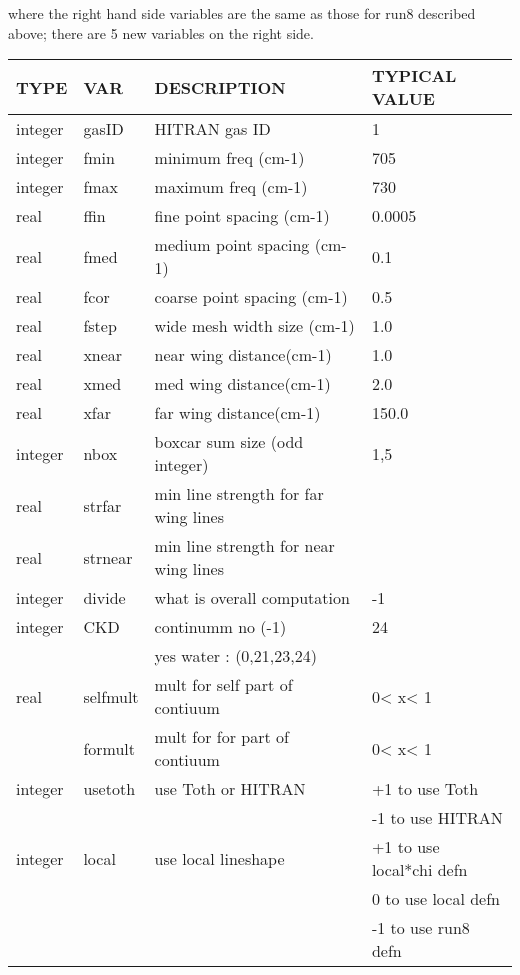 \documentclass[11pt]{article}
\begin{document}
where the right hand side variables are the same as those for run8 
described above; there are 5 new variables on the right side.

\begin{longtable}{llll}
\hline
\hline
  TYPE  &   VAR  &         DESCRIPTION  &            TYPICAL VALUE\\
\hline
\hline
integer & gasID  &       HITRAN gas ID      &            1\\
\hline

integer & fmin    &      minimum freq (cm-1) &          705\\
integer & fmax    &      maximum freq (cm-1) &          730\\
\hline

real   &  ffin    &      fine point spacing (cm-1) &    0.0005\\
real   &  fmed    &      medium point spacing (cm-1)&   0.1\\
real   &  fcor    &      coarse point spacing (cm-1)  & 0.5\\
\hline

real   &  fstep   &      wide mesh width size (cm-1) &    1.0\\
real   &  xnear   &      near wing distance(cm-1)    &    1.0\\
real   &  xmed    &      med wing distance(cm-1)     &    2.0\\
real   &  xfar    &      far wing distance(cm-1)     &    150.0\\
\hline

integer & nbox     &     boxcar sum size (odd integer) &  1,5\\
\hline

real   &  strfar   &    min line strength for far wing lines & \\
real   &  strnear  &    min line strength for near wing lines& \\
\hline
integer &  divide  &      what is overall computation    &   -1 \\
integer &  CKD     &       continumm no (-1)            &   24 \\
        &          &       yes water : (0,21,23,24)     &      \\
\hline

real    &  selfmult &       mult for self part of contiuum & 0< x< 1 \\
        &  formult  &       mult for for  part of contiuum & 0< x< 1 \\
\hline

integer & usetoth &        use Toth or HITRAN &           +1 to use Toth \\
        &         &                           &          -1 to use HITRAN \\
\hline

integer & local &         use local lineshape   & +1 to use local*chi defn\\
        &       &                                  &  0 to use local defn \\
        &       &                                  & -1 to use run8 defn\\
\hline
\hline
\end{longtable}
\end{document}

